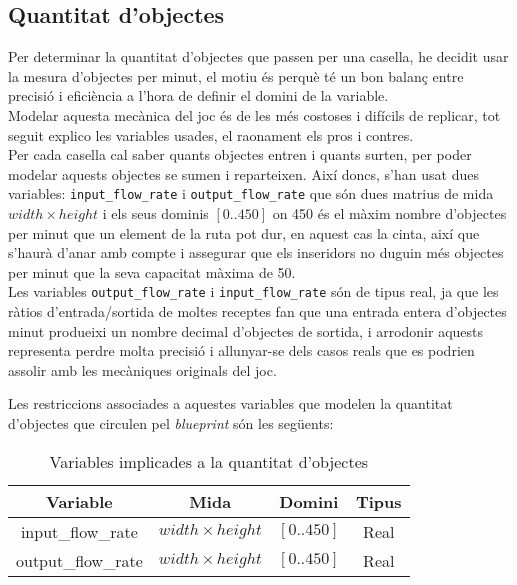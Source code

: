 \subsection{Quantitat d'objectes}
Per determinar la quantitat d'objectes que passen per una casella, he decidit usar la mesura d'objectes per minut, el motiu és perquè té un bon balanç entre precisió i eficiència a l'hora de definir el domini de la variable.\\
Modelar aquesta mecànica del joc és de les més costoses i difícils de replicar, tot seguit explico les variables usades, el raonament els pros i contres.\\
Per cada casella cal saber quants objectes entren i quants surten, per poder modelar aquests objectes se sumen i reparteixen. Així doncs, s'han usat dues variables: \lstinline{input_flow_rate} i \lstinline{output_flow_rate} que són dues matrius de mida $width \times height$ i els seus dominis $[0..450]$ on 450 és el màxim nombre d'objectes per minut que un element de la ruta pot dur, en aquest cas la cinta, així que s'haurà d'anar amb compte i assegurar que els inseridors no duguin més objectes per minut que la seva capacitat màxima de 50.\\
Les variables \lstinline{output_flow_rate} i \lstinline{input_flow_rate} són de tipus real, ja que les ràtios d'entrada/sortida de moltes receptes fan que una entrada entera d'objectes minut produeixi un nombre decimal d'objectes de sortida, i arrodonir aquests representa perdre molta precisió i allunyar-se dels casos reals que es podrien assolir amb les mecàniques originals del joc.

Les restriccions associades a aquestes variables que modelen la quantitat d'objectes que circulen pel \textit{blueprint} són les següents:
\begin{table}[h]
    \centering
    \begin{tabular}{|c|c|c|c|}
    \hline
    \textbf{Variable} & \textbf{Mida} & \textbf{Domini} & \textbf{Tipus}\\
    \hline
    input\_flow\_rate & $width \times height$ & $[0..450]$ & Real\\
    \hline
    output\_flow\_rate & $width \times height$ & $[0..450]$ & Real\\
    \hline
    \end{tabular}
    \caption{Variables implicades a la quantitat d'objectes}
    \label{item_flow_rate-variables}
\end{table}


